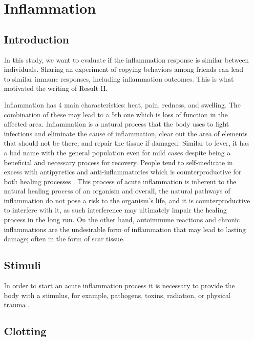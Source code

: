 \section{Inflammation}

\subsection{Introduction}

In this study, we want to evaluate if the inflammation response is similar between individuals. Sharing an experiment of copying behaviors among friends can lead to similar immune responses, including inflammation outcomes. This is what motivated the writing of \colorbox{ResultColor}{\textcolor{black}{Result II}}.


Inflammation has 4 main characteristics: heat, pain, redness, and swelling. The combination of these may lead to a 5th one which is loss of function in the affected area. Inflammation is a natural process that the body uses to fight infections and eliminate the cause of inflammation, clear out the area of elements that should not be there, and repair the tissue if damaged. Similar to fever, it has a bad name with the general population even for mild cases despite being a beneficial and necessary process for recovery. People tend to self-medicate in excess with antipyretics and anti-inflammatories which is counterproductive for both healing processes \cite{Serhan2014}. This process of acute inflammation is inherent to the natural healing process of an organism and overall, the natural pathways of inflammation do not pose a risk to the organism's life, and it is counterproductive to interfere with it, as such interference may ultimately impair the healing process in the long run. On the other hand, autoimmune reactions and chronic inflammations are the undesirable form of inflammation that may lead to lasting damage; often in the form of scar tissue.

\subsection{Stimuli}

In order to start an acute inflammation process it is necessary to provide the body with a stimulus, for example, pathogens, toxins, radiation, or physical trauma \cite{LKiss2022}.

\subsection{Clotting}


